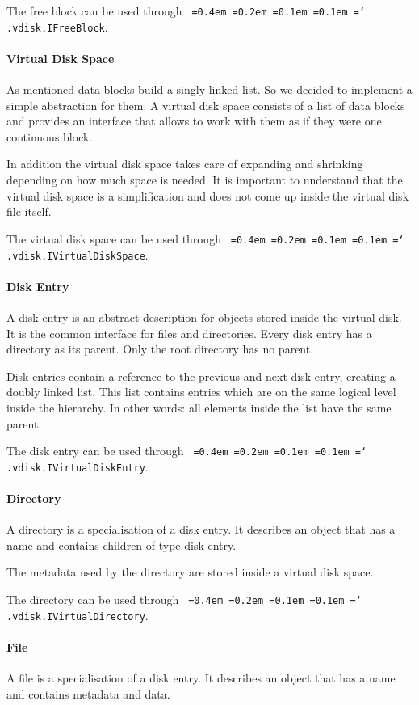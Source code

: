 \documentclass[a4paper,12pt]{article}
\newcommand*\justify{%
  \fontdimen2\font=0.4em%
  \fontdimen3\font=0.2em%
  \fontdimen4\font=0.1em%
  \fontdimen7\font=0.1em%
  \hyphenchar\font=`\-%
}
\newcommand{\mono}[1]{\texttt{\justify #1}}
\begin{document}
The free block can be used through \mono{.vdisk.IFreeBlock}.

\paragraph{Virtual Disk Space}
As mentioned data blocks build a singly linked list. So we decided to implement a simple abstraction for them. A virtual disk space consists of a list of data blocks and provides an interface that allows to work with them as if they were one continuous block.

In addition the virtual disk space takes care of expanding and shrinking depending on how much space is needed. It is important to understand that the virtual disk space is a simplification and does not come up inside the virtual disk file itself.

The virtual disk space can be used through \mono{.vdisk.IVirtualDiskSpace}.

\paragraph{Disk Entry}
A disk entry is an abstract description for objects stored inside the virtual disk. It is the common interface for files and directories. Every disk entry has a directory as its parent. Only the root directory has no parent.

Disk entries contain a reference to the previous and next disk entry, creating a doubly linked list. This list contains entries which are on the same logical level inside the hierarchy. In other words: all elements inside the list have the same parent.

The disk entry can be used through \mono{.vdisk.IVirtualDiskEntry}.

\paragraph{Directory}
A directory is a specialisation of a disk entry. It describes an object that has a name and contains children of type disk entry.

The metadata used by the directory are stored inside a virtual disk space.

The directory can be used through \mono{.vdisk.IVirtualDirectory}.

\paragraph{File}
A file is a specialisation of a disk entry. It describes an object that has a name and contains metadata and data.
\end{document}
